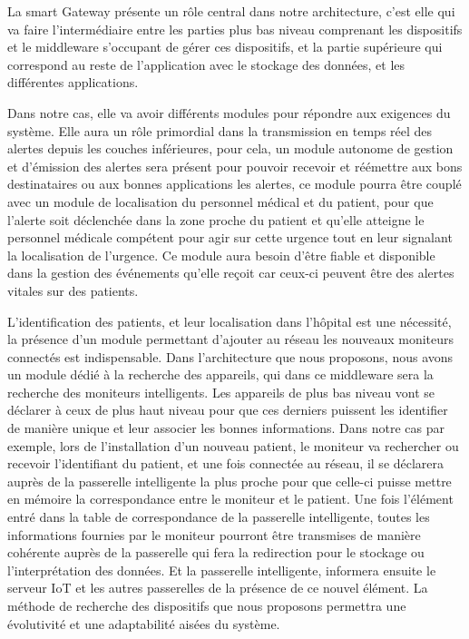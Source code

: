 La smart Gateway présente un rôle central dans notre architecture, c’est elle qui va faire l’intermédiaire entre les parties plus bas niveau comprenant les dispositifs et le middleware s’occupant de gérer ces dispositifs, et la partie supérieure qui correspond au reste de l’application avec le stockage des données, et les différentes applications.
\newline

Dans notre cas, elle va avoir différents modules pour répondre aux exigences du système. Elle aura un rôle primordial dans la transmission en temps réel des alertes depuis les couches inférieures, pour cela, un module autonome de gestion et d’émission des alertes sera présent pour pouvoir recevoir et réémettre aux bons destinataires ou aux bonnes applications les alertes, ce module pourra être couplé avec un module de localisation du personnel médical et du patient, pour que l’alerte soit déclenchée dans la zone proche du patient et qu’elle atteigne le personnel médicale compétent pour agir sur cette urgence tout en leur signalant la localisation de l’urgence. Ce module aura besoin d’être fiable et disponible dans la gestion des événements qu’elle reçoit car ceux-ci peuvent être des alertes vitales sur des patients.

L’identification des patients, et leur localisation dans l’hôpital est une nécessité, la présence d’un module permettant d’ajouter au réseau les nouveaux moniteurs connectés est indispensable. Dans l’architecture que nous proposons, nous avons un module dédié à la recherche des appareils, qui dans ce middleware sera la recherche des moniteurs intelligents. Les appareils de plus bas niveau vont se déclarer à ceux de plus haut niveau pour que ces derniers puissent les identifier de manière unique et leur associer les bonnes informations. Dans notre cas par exemple, lors de l’installation d’un nouveau patient, le moniteur va rechercher ou recevoir l’identifiant du patient, et une fois connectée au réseau, il se déclarera auprès de la passerelle intelligente la plus proche pour que celle-ci puisse mettre en mémoire la correspondance entre le moniteur et le patient. Une fois l’élément entré dans la table de correspondance de la passerelle intelligente, toutes les informations fournies par le moniteur pourront être transmises de manière cohérente auprès de la passerelle qui fera la redirection pour le stockage ou l’interprétation des données. Et la passerelle intelligente, informera ensuite le serveur IoT et les autres passerelles de la présence de ce nouvel élément. La méthode de recherche des dispositifs que nous proposons permettra une évolutivité et une adaptabilité aisées du système.

